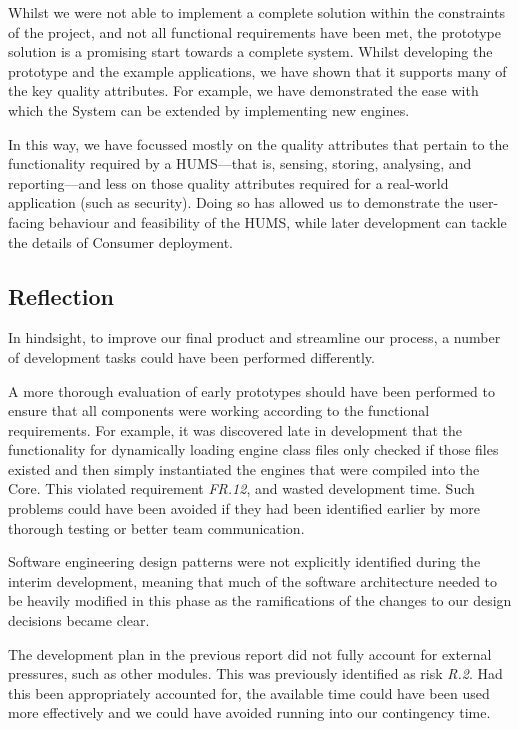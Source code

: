 \documentclass[10pt,a4paper]{article}
\begin{document}
Whilst we were not able to implement a complete solution within the constraints of the project, and not all functional requirements have been met, the prototype solution is a promising start towards a complete system. Whilst developing the prototype and the example applications, we have shown that it supports many of the key quality attributes. For example, we have demonstrated the ease with which the System can be extended by implementing new engines.

In this way, we have focussed mostly on the quality attributes that pertain to the functionality required by a HUMS---that is, sensing, storing, analysing, and reporting---and less on those quality attributes required for a real-world application (such as security). Doing so has allowed us to demonstrate the user-facing behaviour and feasibility of the HUMS, while later development can tackle the details of Consumer deployment.

\subsection{Reflection}
\label{sec:reflection}

In hindsight, to improve our final product and streamline our process, a number of development tasks could have been performed differently.

A more thorough evaluation of early prototypes should have been performed to ensure that all components were working according to the functional requirements. For example, it was discovered late in development that the functionality for dynamically loading engine class files only checked if those files existed and then simply instantiated the engines that were compiled into the Core. This violated requirement \emph{FR.12}, and wasted development time. Such problems could have been avoided if they had been identified earlier by more thorough testing or better team communication.

Software engineering design patterns were not explicitly identified during the interim development, meaning that much of the software architecture needed to be heavily modified in this phase as the ramifications of the changes to our design decisions became clear.

The development plan in the previous report did not fully account for external pressures, such as other modules. This was previously identified as risk \emph{R.2}. Had this been appropriately accounted for, the available time could have been used more effectively and we could have avoided running into our contingency time.
\end{document}
